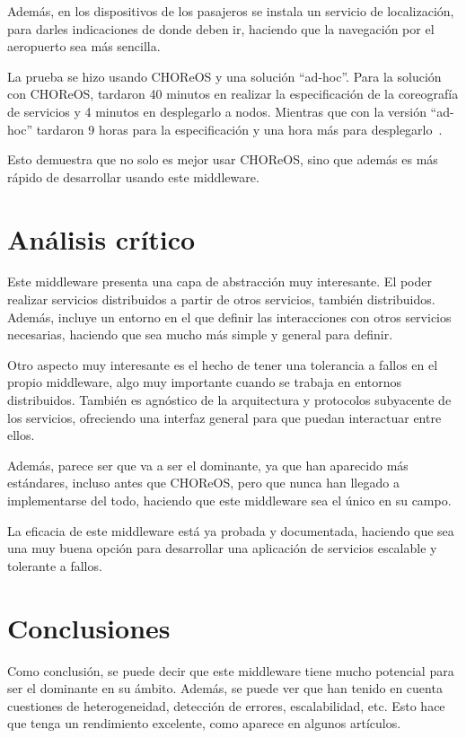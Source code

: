 \documentclass[runningheads]{llncs}
\begin{document}
Además, en los dispositivos de los pasajeros se instala un servicio de localización, para darles indicaciones de donde deben ir, haciendo que la navegación por el aeropuerto sea más sencilla.~\cite{a_128}

La prueba se hizo usando CHOReOS y una solución ``ad-hoc''. Para la solución con CHOReOS, tardaron 40 minutos en realizar la especificación de la coreografía de servicios y 4 minutos en desplegarlo a nodos. Mientras que con la versión ``ad-hoc'' tardaron 9 horas para la especificación y una hora más para desplegarlo~\cite{a_20}.

Esto demuestra que no solo es mejor usar CHOReOS, sino que además es más rápido de desarrollar usando este middleware.

\section{Análisis crítico}
Este middleware presenta una capa de abstracción muy interesante. El poder realizar servicios distribuidos a partir de otros servicios, también distribuidos. Además, incluye un entorno en el que definir las interacciones con otros servicios necesarias, haciendo que sea mucho más simple y general para definir.

Otro aspecto muy interesante es el hecho de tener una tolerancia a fallos en el propio middleware, algo muy importante cuando se trabaja en entornos distribuidos. También es agnóstico de la arquitectura y protocolos subyacente de los servicios, ofreciendo una interfaz general para que puedan interactuar entre ellos.

Además, parece ser que va a ser el dominante, ya que han aparecido más estándares, incluso antes que CHOReOS, pero que nunca han llegado a implementarse del todo, haciendo que este middleware sea el único en su campo.

La eficacia de este middleware está ya probada y documentada, haciendo que sea una muy buena opción para desarrollar una aplicación de servicios escalable y tolerante a fallos.

\section{Conclusiones}
Como conclusión, se puede decir que este middleware tiene mucho potencial para ser el dominante en su ámbito. Además, se puede ver que han tenido en cuenta cuestiones de heterogeneidad, detección de errores, escalabilidad, etc. Esto hace que tenga un rendimiento excelente, como aparece en algunos artículos.
\end{document}
